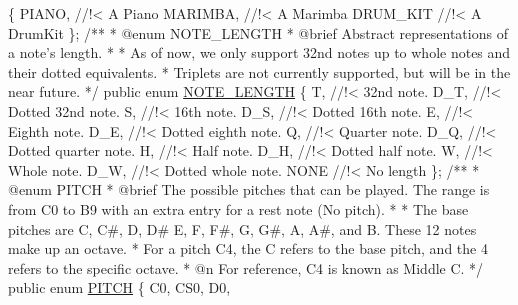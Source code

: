 \begin{DoxyCodeInclude}
    \{
        PIANO, \textcolor{comment}{//!< A Piano}
\textcolor{comment}{}        MARIMBA, \textcolor{comment}{//!< A Marimba}
\textcolor{comment}{}        DRUM\_KIT \textcolor{comment}{//!< A DrumKit}
\textcolor{comment}{}    \};
\textcolor{comment}{}
\textcolor{comment}{    /**}
\textcolor{comment}{     * @enum NOTE\_LENGTH}
\textcolor{comment}{     * @brief Abstract representations of a note's length.}
\textcolor{comment}{     * }
\textcolor{comment}{     * As of now, we only support 32nd notes up to whole notes and their dotted equivalents.}
\textcolor{comment}{     * Triplets are not currently supported, but will be in the near future.}
\textcolor{comment}{    */}
    \textcolor{keyword}{public} \textcolor{keyword}{enum} \hyperlink{group___music_enums_gaf11b5f079adbb21c800b9eca1c5c3cbd}{NOTE\_LENGTH}
    \{
        T, \textcolor{comment}{//!< 32nd note.}
\textcolor{comment}{}        D\_T, \textcolor{comment}{//!< Dotted 32nd note.}
\textcolor{comment}{}        S, \textcolor{comment}{//!< 16th note.}
\textcolor{comment}{}        D\_S, \textcolor{comment}{//!< Dotted 16th note.}
\textcolor{comment}{}        E, \textcolor{comment}{//!< Eighth note.}
\textcolor{comment}{}        D\_E, \textcolor{comment}{//!< Dotted eighth note.}
\textcolor{comment}{}        Q, \textcolor{comment}{//!< Quarter note.}
\textcolor{comment}{}        D\_Q, \textcolor{comment}{//!< Dotted quarter note.}
\textcolor{comment}{}        H, \textcolor{comment}{//!< Half note.}
\textcolor{comment}{}        D\_H, \textcolor{comment}{//!< Dotted half note.}
\textcolor{comment}{}        W, \textcolor{comment}{//!< Whole note.}
\textcolor{comment}{}        D\_W, \textcolor{comment}{//!< Dotted whole note.}
\textcolor{comment}{}        NONE \textcolor{comment}{//!< No length }
\textcolor{comment}{}    \};
\textcolor{comment}{}
\textcolor{comment}{    /** }
\textcolor{comment}{     * @enum PITCH}
\textcolor{comment}{     * @brief The possible pitches that can be played. The range is from C0 to B9 with an extra entry for a
       rest note (No pitch).}
\textcolor{comment}{     * }
\textcolor{comment}{     * The base pitches are C, C#, D, D# E, F, F#, G, G#, A, A#, and B. These 12 notes make up an octave.}
\textcolor{comment}{     * For a pitch C4, the C refers to the base pitch, and the 4 refers to the specific octave. }
\textcolor{comment}{     * @n For reference, C4 is known as Middle C. }
\textcolor{comment}{    */}
    \textcolor{keyword}{public} \textcolor{keyword}{enum} \hyperlink{group___music_enums_ga508f69b199ea518f935486c990edac1d}{PITCH}
    \{
        C0,
        CS0,
        D0,

\end{DoxyCodeInclude}
